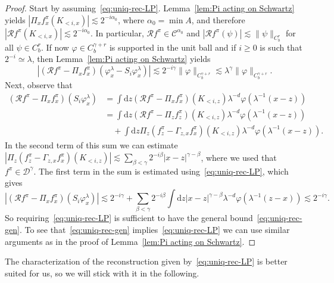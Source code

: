 \documentclass[a4paper,11pt]{article}
\newcommand{\mathd}{\mathrm{d}}
\theoremstyle{remark}
\newcommand{\CC}{\ensuremath{\mathscr{C}}}
\begin{document}
\begin{proof}
  Start by assuming~\eqref{eq:uniq-rec-LP}. Lemma~\ref{lem:Pi acting on Schwartz} yields $|\Pi_{x} f^{\pi}_{x} (K_{< i,x} )| \lesssim 2^{-i \alpha_0}$, where $\alpha_0 = \min A$, and therefore $| \mathcal{R}f^{\pi} ( K_{< i,x} ) | \lesssim 2^{-i \alpha_0}$. In particular, $\mathcal R f^\pi \in \CC^{\alpha_0}$ and $|\mathcal R f^\pi (\psi)| \lesssim \|\psi\|_{C^r_b}$ for all $\psi \in C^r_b$. If now $\varphi \in C_b^{\gamma+r}$ is supported in the unit ball and if $i \geqslant 0$ is such that $2^{-i}\simeq \lambda$, then Lemma~\ref{lem:Pi acting on Schwartz} yields
  \[
     | ( \mathcal{R}f^{\pi} - \Pi_{x} f^{\pi}_{x} ) ( \varphi^{\lambda}_{x} - S_i \varphi^{\lambda}_{x} ) | \lesssim 2^{-i \gamma} \|\varphi\|_{C^{\gamma+r}_b} \lesssim \lambda^{\gamma} \|\varphi\|_{C^{\gamma+r}_b}.
  \]
  Next, observe that
  \begin{align*}
     ( \mathcal{R}f^{\pi} - \Pi_{x} f^{\pi}_{x} ) ( S_i \varphi^{\lambda}_{x} ) &= \int \mathd z ( \mathcal{R}f^{\pi} - \Pi_{x} f^{\pi}_{x} ) ( K_{< i,z} ) \lambda^{-d} \varphi ( \lambda^{-1} ( x-z ) ) \\
     & = \int \mathd z ( \mathcal{R}f^{\pi} - \Pi_{z} f^{\pi}_{z} ) ( K_{< i,z} ) \lambda^{-d} \varphi ( \lambda^{-1} ( x-z ) ) \\
     &\quad + \int \mathd z \Pi_{z} ( f^{\pi}_{z} - \Gamma_{z,x} f^{\pi}_{x} ) (K_{< i,z} ) \lambda^{-d} \varphi ( \lambda^{-1} ( x-z ) ).
  \end{align*}
  In the second term of this sum we can estimate $| \Pi_{z} ( f^{\pi}_{z} - \Gamma_{z,x} f^{\pi}_{x} ) ( K_{< i,z} ) | \lesssim \sum_{\beta < \gamma} 2^{-i \beta} | x-z |^{\gamma - \beta}$, where we used that $f^{\pi} \in \mathcal{D}^{\gamma}$. The first term in the sum is estimated using~{\eqref{eq:uniq-rec-LP}}, which gives
  \[
     |( \mathcal{R}f^{\pi} - \Pi_{x} f^{\pi}_{x} ) ( S_i \varphi^{\lambda}_{x} )| \lesssim 2^{-i \gamma} + \sum_{\beta < \gamma}  2^{-i \beta} \int \mathd z | x-z |^{\gamma - \beta} \lambda^{-d} \varphi     ( \lambda^{-1} ( z-x ) ) \lesssim 2^{-i \gamma}.
  \]
  So requiring~{\eqref{eq:uniq-rec-LP}} is sufficient to have the general
  bound~{\eqref{eq:uniq-rec-gen}}. To see that~{\eqref{eq:uniq-rec-gen}} implies~{\eqref{eq:uniq-rec-LP}} we can use similar arguments as in the proof of Lemma~\ref{lem:Pi acting on Schwartz}.
\end{proof}

The characterization of the reconstruction given by~{\eqref{eq:uniq-rec-LP}}
is better suited for us, so we will stick with it in the following.
\end{document}
